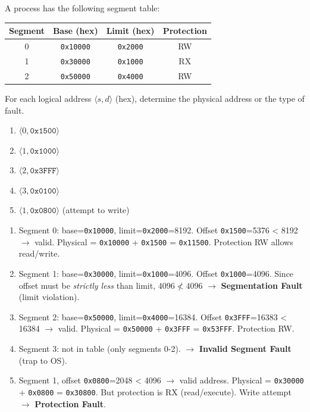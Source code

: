 \documentclass[11pt]{article}
\begin{document}
\begin{exoresolu}
A process has the following segment table:
\begin{center}
\begin{tabular}{|c|c|c|c|}\hline
Segment & Base (hex) & Limit (hex) & Protection \\ \hline
0 & \texttt{0x10000} & \texttt{0x2000} & RW \\
1 & \texttt{0x30000} & \texttt{0x1000} & RX \\
2 & \texttt{0x50000} & \texttt{0x4000} & RW \\ \hline
\end{tabular}
\end{center}
For each logical address $\langle s, d \rangle$ (hex), determine the physical address or the type of fault.
\begin{enumerate}
\item $\langle 0, \texttt{0x1500} \rangle$
\item $\langle 1, \texttt{0x1000} \rangle$
\item $\langle 2, \texttt{0x3FFF} \rangle$
\item $\langle 3, \texttt{0x0100} \rangle$
\item $\langle 1, \texttt{0x0800} \rangle$ (attempt to write)
\end{enumerate}
\tcblower
\begin{enumerate}
\item Segment 0: base=\texttt{0x10000}, limit=\texttt{0x2000}=8192. Offset \texttt{0x1500}=5376 < 8192 $\rightarrow$ valid. Physical = \texttt{0x10000} + \texttt{0x1500} = \texttt{0x11500}. Protection RW allows read/write.
\item Segment 1: base=\texttt{0x30000}, limit=\texttt{0x1000}=4096. Offset \texttt{0x1000}=4096. Since offset must be \emph{strictly less} than limit, $4096 \not< 4096$ $\rightarrow$ \textbf{Segmentation Fault} (limit violation).
\item Segment 2: base=\texttt{0x50000}, limit=\texttt{0x4000}=16384. Offset \texttt{0x3FFF}=16383 < 16384 $\rightarrow$ valid. Physical = \texttt{0x50000} + \texttt{0x3FFF} = \texttt{0x53FFF}. Protection RW.
\item Segment 3: not in table (only segments 0-2). $\rightarrow$ \textbf{Invalid Segment Fault} (trap to OS).
\item Segment 1, offset \texttt{0x0800}=2048 < 4096 $\rightarrow$ valid address. Physical = \texttt{0x30000} + \texttt{0x0800} = \texttt{0x30800}. But protection is RX (read/execute). Write attempt $\rightarrow$ \textbf{Protection Fault}.
\end{enumerate}
\end{exoresolu}
\end{document}
